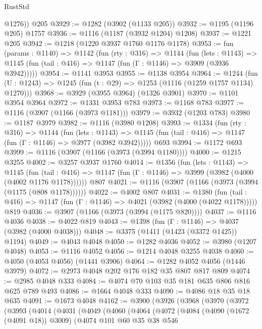 \begin{lexlean}{RustStd}
\begin{coremodule}
        @1276))
    @205
@3929 := @1282 (@3902 (@1133 @205))
@3932 := @1195 (@1196 @205) @1757
@3936 := @1116 (@1187 (@3932 @1204) @1208)
@3937 := @1221 @205
@3942 := @1218 (@1220 @3937 @1760 @1176 @1178)
@3953 := fun (params : @1140) =>
  @1142
    (fun (rty : @316) =>
    @1144
      (fun (lets : @1143) =>
      @1145 (fun (tail : @416) => @1147 (fun (Γ : @1146) => @3909 (@3936 @3942)))))
@3954 := @1141 @3953
@3955 := @1138 @3954
@3964 := @1244 (fun (U : @1243) => @1245 (fun (t : @29) => @1253 (@1116 (@1259 @1757 @1134) @1270)))
@3968 := @3929 (@3955 @3964) (@1326 @3901)
@3970 := @1101 @3954 @3964
@3972 := @1331 @3953 @783
@3973 := @1168 @783
@3977 := @1116 (@3907 (@1166 (@3973 @1181)))
@3979 := @3932 (@1203 @783)
@3980 := @1187 @3979
@3982 := @1116 (@3980 @1208)
@3993 := @1334
    (fun (rty : @316) =>
    @1144
      (fun (lets : @1143) =>
      @1145 (fun (tail : @416) => @1147 (fun (Γ : @1146) => @3977 (@3982 @3942)))))
    @693
@3994 := @1172 @693
@3999 := @1116 (@3907 (@1166 (@3973 (@3994 @1180))))
@4000 := @1215 @3255
@4002 := @3257 @3937 @1760
@4014 := @1356
    (fun (lets : @1143) =>
    @1145
      (fun (tail : @416) => @1147 (fun (Γ : @1146) => @3999 (@3982 (@4000 (@4002 @1176 @1178))))))
    @807
@4021 := @1116 (@3907 (@1166 (@3973 (@3994 (@1175 (@808 @1178))))))
@4022 := @4002 @807
@4031 := @1380
    (fun (tail : @416) => @1147 (fun (Γ : @1146) => @4021 (@3982 (@4000 (@4022 @1178)))))
    @819
@4036 := @3907 (@1166 (@3973 (@3994 (@1175 @820))))
@4037 := @1116 @4036
@4038 := @4022 @819
@4043 := @1398 (fun (Γ : @1146) => @4037 (@3982 (@4000 @4038)))
@4048 := @3375 (@1411 (@1423 (@3372 @1425)) @1194)
@4049 := @4043 @4048
@4050 := @1282 @4036
@4052 := @3980 (@1207 @4048)
@4053 := @1116 @4052
@4056 := @1214 @4048 @3255 @4038
@4060 := @4050 (@4053 @4056) (@1441 @3906)
@4064 := @1282 @4052 @4056 (@1446 @3979)
@4072 := @2973 @4048 @202 @176 @182 @35 @807 @817 @809
@4074 := @2985 @4048 @333
@4084 := @4074 @70 @103 @35 @181 @635 @806 @816 @625 @789 @493
@4086 := @1664 @4048 @333
@4090 := @4086 @18 @35 @18 @635
@4091 := @1673 @4048
@4162 := @3900
    (@3926
      (@3968
        (@3970
          (@3972
            (@3993
              (@4014
                (@4031
                  (@4049
                    (@4060
                      (@4064
                        (@4072
                          (@4084
                            (@4090 (@1672 (@4091 @18)) @3009)
                            (@4074
                              @101
                              @60
                              @35
                              @38
                              @546

\end{coremodule}
\end{lexlean}
